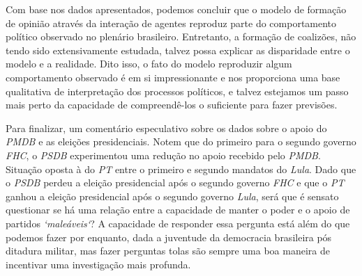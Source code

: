 Com base nos dados apresentados, podemos concluir que o modelo de formação de opinião através da interação de agentes reproduz parte do comportamento político observado no plenário brasileiro.
Entretanto, a formação de coalizões, não tendo sido extensivamente estudada, talvez possa explicar as disparidade entre o modelo e a realidade.
Dito isso, o fato do modelo reproduzir algum comportamento observado é em si impressionante e nos proporciona uma base qualitativa de interpretação dos processos políticos, e talvez estejamos um passo mais perto da capacidade de compreendê-los o suficiente para fazer previsões.

Para finalizar, um comentário especulativo sobre os dados sobre o apoio do \emph{PMDB} e as eleições presidenciais.
Notem que do primeiro para o segundo governo \emph{FHC}, o \emph{PSDB} experimentou uma redução no apoio recebido pelo \emph{PMDB}.
Situação oposta à do \emph{PT} entre o primeiro e segundo mandatos do \emph{Lula}.
Dado que o \emph{PSDB} perdeu a eleição presidencial após o segundo governo \emph{FHC} e que o \emph{PT} ganhou a eleição presidencial após o segundo governo \emph{Lula}, será que é sensato questionar se há uma relação entre a capacidade de manter o poder e o apoio de partidos \emph{`maleáveis`}?
A capacidade de responder essa pergunta está além do que podemos fazer por enquanto, dada a juventude da democracia brasileira pós ditadura militar, mas fazer perguntas tolas são sempre uma boa maneira de incentivar uma investigação mais profunda.

